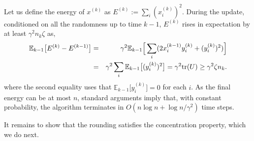 \documentclass[11pt]{article}
\newcommand{\E}{\mathbb{E}}
\theoremstyle{definition}
\begin{document}
Let us define the energy of $x^{(k)}$ as  $E^{(k)} := \sum_i (x_i^{(k)})^2$. During the update, conditioned on all the randomness up to time $k-1$,
 $E^{(k)}$ rises in expectation by at least $\gamma^2 n_k \zeta$ as,
\begin{eqnarray*}
\E_{k-1}\big[E^{(k)}  - E^{(k-1)}\big]  & =  & \gamma^2 \E_{k-1} \Big{[} \sum_i (2 x_i^{(k-1)} y_i^{(k)} + (y_i^{(k)})^2) \Big{]} \\
& = &
 \gamma^2 \sum_i \E_{k-1}\big[(y_i^{(k)})^2\big] =  \gamma^2 \text{tr}(U) \geq \gamma^2 \zeta n_k. %
\end{eqnarray*}
where the second equality uses that $\E_{k-1}\big[y_i^{(k)}\big] =0$ for each $i$.
%
As the final energy can be at most $n$,
standard arguments \cite{B10, LM12} imply that,  with constant probability, the algorithm terminates in $O(n \log n + \log n/\gamma^2 )$ time steps.

%
%
%
%

It remains to show that the rounding satisfies the concentration property, which we do next.
\end{document}
